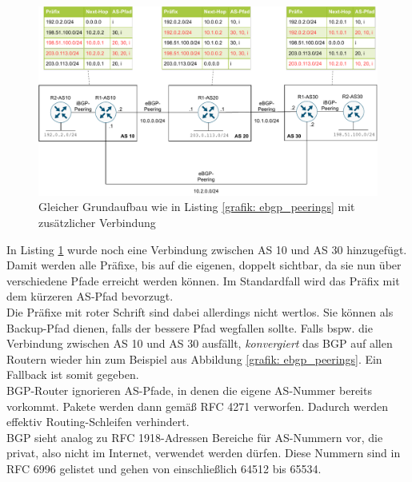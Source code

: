 \begin{figure}[h]
  \centering
  \includegraphics[scale=0.75]{Figures/ebgp_peerings_additional_connection.pdf}
  \caption{Gleicher Grundaufbau wie in Listing \ref{grafik: ebgp_peerings} mit zusätzlicher Verbindung}
  \label{grafik: ebgp_peerings_additional_connection}
\end{figure}\FloatBarrier

In Listing \ref{grafik: ebgp_peerings_additional_connection} wurde noch eine Verbindung zwischen \gls{AS} 10 und \gls{AS} 30 hinzugefügt. Damit werden alle Präfixe, bis auf die eigenen, doppelt sichtbar, da sie nun über verschiedene Pfade erreicht werden können. Im Standardfall wird das Präfix mit dem kürzeren \gls{AS}-Pfad bevorzugt.\\
Die Präfixe mit roter Schrift sind dabei allerdings nicht wertlos. Sie können als Backup-Pfad dienen, falls der bessere Pfad wegfallen sollte. Falls bspw. die Verbindung zwischen \gls{AS} 10 und \gls{AS} 30 ausfällt, \textit{konvergiert} das \gls{BGP} auf allen Routern wieder hin zum Beispiel aus Abbildung \ref{grafik: ebgp_peerings}. Ein \gls{Fallback} ist somit gegeben.\\
BGP-Router ignorieren \gls{AS}-Pfade, in denen die eigene \gls{AS}-Nummer bereits vorkommt. Pakete werden dann gemäß \gls{RFC} 4271 verworfen. Dadurch werden effektiv Routing-Schleifen verhindert\cite{rfc4271}.\\
BGP sieht analog zu \gls{RFC} 1918-Adressen Bereiche für \gls{AS}-Nummern vor, die privat, also nicht im Internet, verwendet werden dürfen. Diese Nummern sind in \gls{RFC} 6996 gelistet und gehen von einschließlich 64512 bis 65534\cite{rfc6996}.

